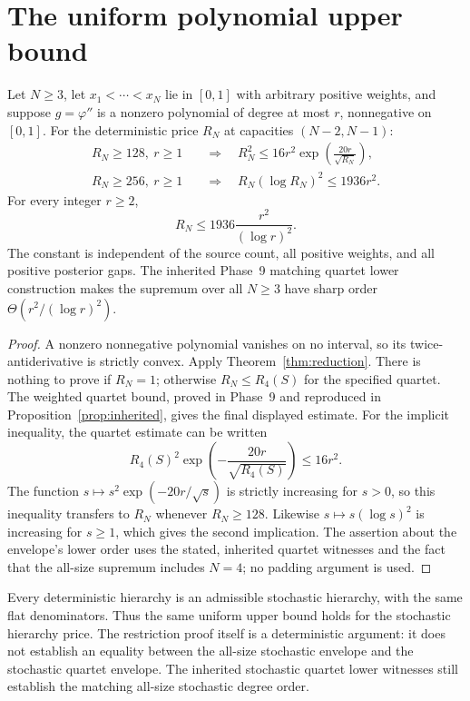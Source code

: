\section{The uniform polynomial upper bound}


\begin{theorem}
\label{thm:degree}
Let $N\ge3$, let $x_1<\cdots<x_N$ lie in $[0,1]$ with arbitrary positive
weights, and suppose $g=\varphi''$ is a nonzero polynomial of degree at
most $r$, nonnegative on $[0,1]$. For the deterministic price $R_N$ at
capacities $(N-2,N-1)$:
\begin{align*}
 R_N\ge128,\ r\ge1
 &\quad\Longrightarrow\quad
 R_N^2\le16r^2\exp\left(\frac{20r}{\sqrt{R_N}}\right),\\
 R_N\ge256,\ r\ge1
 &\quad\Longrightarrow\quad
 R_N(\log R_N)^2\le1936r^2.
\end{align*}
For every integer $r\ge2$,
\[
 \boxed{\displaystyle R_N\le1936\frac{r^2}{(\log r)^2}.}
\]
The constant is independent of the source count, all positive weights,
and all positive posterior gaps. The inherited Phase~9 matching quartet
lower construction makes the supremum over all $N\ge3$ have sharp order
$\Theta(r^2/(\log r)^2)$.
\end{theorem}

\begin{proof}
A nonzero nonnegative polynomial vanishes on no interval, so its
twice-antiderivative is strictly convex. Apply
Theorem~\ref{thm:reduction}. There is nothing to prove if $R_N=1$;
otherwise $R_N\le R_4(S)$ for the specified quartet. The weighted quartet
bound, proved in Phase~9 and reproduced in
Proposition~\ref{prop:inherited}, gives the final displayed estimate.
For the implicit inequality, the quartet estimate can be written
\[
 R_4(S)^2\exp\left(-\frac{20r}{\sqrt{R_4(S)}}\right)\le16r^2.
\]
The function $s\mapsto s^2\exp(-20r/\sqrt{s})$ is strictly increasing
for $s>0$, so this inequality transfers to $R_N$ whenever $R_N\ge128$.
Likewise $s\mapsto s(\log s)^2$ is increasing for $s\ge1$, which gives
the second implication. The assertion about the envelope's lower order
uses the stated, inherited quartet witnesses and the fact that the
all-size supremum includes $N=4$; no padding argument is used.
\end{proof}

\begin{remark}
Every deterministic hierarchy is an admissible stochastic hierarchy,
with the same flat denominators. Thus the same uniform upper bound
holds for the stochastic hierarchy price. The restriction proof itself
is a deterministic argument: it does not establish an equality between
the all-size stochastic envelope and the stochastic quartet envelope.
The inherited stochastic quartet lower witnesses still establish the
matching all-size stochastic degree order.
\end{remark}

